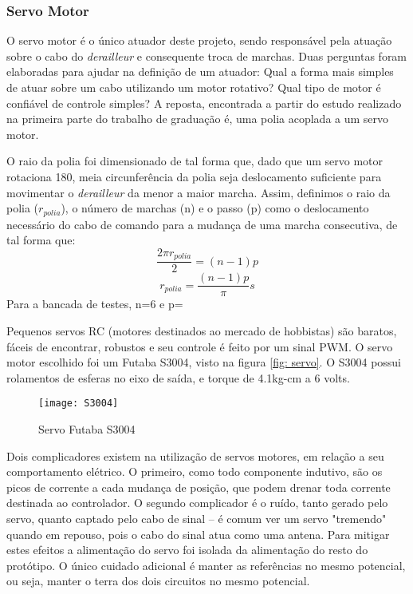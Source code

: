 \documentclass[a4paper,11pt]{article}
\begin{document}
\subsubsection{Servo Motor}
\label{sec:servo}
O servo motor é o único atuador deste projeto, sendo responsável pela atuação
sobre o cabo do \textit{derailleur} e consequente troca de marchas. Duas
perguntas foram elaboradas para ajudar na definição de um atuador: Qual a
forma mais simples de atuar sobre um cabo utilizando um motor rotativo? Qual
tipo de motor é confiável de controle simples? A reposta, encontrada a partir
do estudo realizado na primeira parte do trabalho de graduação é, uma polia
acoplada a um servo motor.

O raio da polia foi dimensionado de tal forma que, dado que um servo motor
rotaciona 180\textdegree, meia circunferência da polia seja deslocamento
suficiente para movimentar o \textit{derailleur} da menor a maior marcha.
Assim, definimos o raio da polia ($r_{polia}$), o número de marchas (n) e o
passo (p) como o deslocamento necessário do cabo de comando para a mudança de
uma marcha consecutiva, de tal forma que:
\begin{equation*}
  \frac{\displaystyle 2\pi r_{polia} }{\displaystyle 2} = (n-1)p
\end{equation*}
\begin{equation}
  r_{polia} = \frac{\displaystyle (n-1)p}{\displaystyle \pi}s
\end{equation}
Para a bancada de testes, n=6 e p=%

Pequenos servos RC (motores destinados ao mercado de hobbistas) são baratos,
fáceis de encontrar, robustos e seu controle é feito por um sinal PWM. O
servo motor escolhido foi um Futaba S3004, visto na figura \ref{fig:
servo}. O S3004 possui rolamentos de esferas no eixo de saída, e torque de
4.1kg-cm a 6 volts.

\begin{figure}[ht]
 \begin{center}
  \texttt{[image: S3004]}
 \end{center}
 \caption{Servo Futaba S3004}
 \label{fig: servo}
\end{figure}

Dois complicadores existem na utilização de servos motores\cite{servo}, em
relação a seu comportamento elétrico. O primeiro, como todo componente indutivo,
são os picos de corrente a cada mudança de posição, que podem drenar toda
corrente destinada ao controlador. O segundo complicador é o ruído, tanto gerado
pelo servo, quanto captado pelo cabo de sinal -- é comum ver um servo "tremendo"
quando em repouso, pois o cabo do sinal atua como uma antena. Para mitigar estes
efeitos a alimentação do servo foi isolada da alimentação do resto do
protótipo. O único cuidado adicional é manter as referências no mesmo
potencial, ou seja, manter o terra dos dois circuitos no mesmo potencial.
\end{document}
